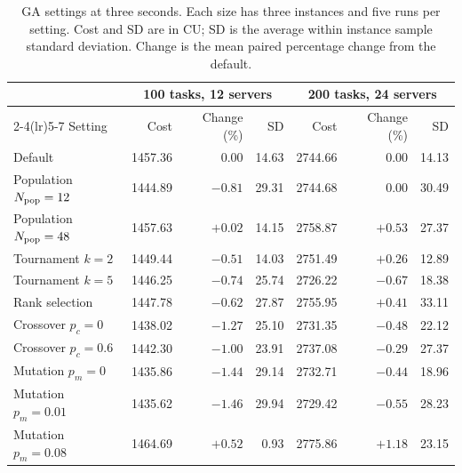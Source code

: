 \begin{table}[htbp]
\centering
\small
\caption{GA settings at three seconds. Each size has three instances and five runs per setting. Cost and SD are in CU; SD is the average within instance sample standard deviation. Change is the mean paired percentage change from the default.}
\label{tab:ga-tuning}
\begin{tabular}{lrrrrrr}
\toprule
& \multicolumn{3}{c}{100 tasks, 12 servers} & \multicolumn{3}{c}{200 tasks, 24 servers} \\
\cmidrule(lr){2-4}\cmidrule(lr){5-7}
Setting & Cost & Change (\%) & SD & Cost & Change (\%) & SD \\
\midrule
Default & 1457.36 & $0.00$ & 14.63 & 2744.66 & $0.00$ & 14.13 \\
Population $N_{\rm pop}=12$ & 1444.89 & $-0.81$ & 29.31 & 2744.68 & $0.00$ & 30.49 \\
Population $N_{\rm pop}=48$ & 1457.63 & $+0.02$ & 14.15 & 2758.87 & $+0.53$ & 27.37 \\
Tournament $k=2$ & 1449.44 & $-0.51$ & 14.03 & 2751.49 & $+0.26$ & 12.89 \\
Tournament $k=5$ & 1446.25 & $-0.74$ & 25.74 & 2726.22 & $-0.67$ & 18.38 \\
Rank selection & 1447.78 & $-0.62$ & 27.87 & 2755.95 & $+0.41$ & 33.11 \\
Crossover $p_c=0$ & 1438.02 & $-1.27$ & 25.10 & 2731.35 & $-0.48$ & 22.12 \\
Crossover $p_c=0.6$ & 1442.30 & $-1.00$ & 23.91 & 2737.08 & $-0.29$ & 27.37 \\
Mutation $p_m=0$ & 1435.86 & $-1.44$ & 29.14 & 2732.71 & $-0.44$ & 18.96 \\
Mutation $p_m=0.01$ & 1435.62 & $-1.46$ & 29.94 & 2729.42 & $-0.55$ & 28.23 \\
Mutation $p_m=0.08$ & 1464.69 & $+0.52$ & 0.93 & 2775.86 & $+1.18$ & 23.15 \\
\bottomrule
\end{tabular}
\end{table}
